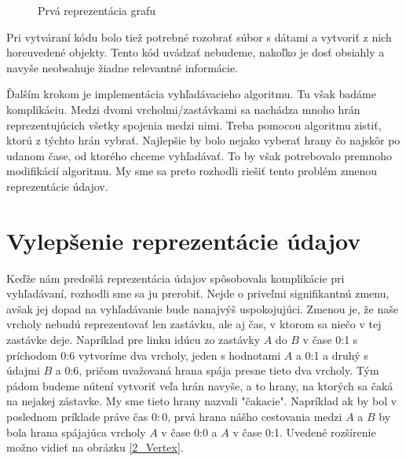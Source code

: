 \begin{figure}[H]
  \caption{Prvá reprezentácia grafu}
  \label{1_Graph}
\end{figure}

Pri vytváraní kódu bolo tiež potrebné rozobrať súbor s dátami a vytvoriť z nich horeuvedené objekty. Tento kód uvádzať nebudeme, nakoľko je dosť obsiahly a navyše neobsahuje žiadne relevantné informácie.\newline

Ďalším krokom je implementácia vyhľadávacieho algoritmu. Tu však badáme komplikáciu. Medzi dvomi vrcholmi/zastávkami sa nachádza mnoho hrán reprezentujúcich všetky spojenia medzi nimi. Treba pomocou algoritmu zistiť, ktorú z týchto hrán vybrať. Najlepšie by bolo nejako vyberať hrany čo najskôr po udanom čase, od ktorého chceme vyhľadávať. To by však potrebovalo premnoho modifikácií algoritmu. My sme sa preto rozhodli riešiť tento problém zmenou reprezentácie údajov.\newline


\section{Vylepšenie reprezentácie údajov}

Keďže nám predošlá reprezentácia údajov spôsobovala komplikácie pri vyhľadávaní, rozhodli sme sa ju prerobiť. Nejde o priveľmi signifikantnú zmenu, avšak jej dopad na vyhľadávanie bude nanajvýš uspokojujúci. Zmenou je, že naše vrcholy nebudú reprezentovať len zastávku, ale aj čas, v ktorom sa niečo v tej zastávke deje. Napríklad pre linku idúcu zo zastávky $A$ do $B$ v čase 0:1 s príchodom 0:6 vytvoríme dva vrcholy, jeden s hodnotami $A$ a 0:1 a druhý s údajmi $B$ a 0:6, pričom uvažovaná hrana spája presne tieto dva vrcholy. Tým pádom budeme nútení vytvoriť veľa hrán navyše, a to hrany, na ktorých sa čaká na nejakej zástavke. My sme tieto hrany nazvali "čakacie". Napríklad ak by bol v poslednom príklade práve čas $0:0$, prvá hrana nášho cestovania medzi $A$ a $B$ by bola hrana spájajúca vrcholy $A$ v čase 0:0 a $A$ v čase 0:1. Uvedené rozšírenie možno vidieť na obrázku \ref{2_Vertex}.\newline

